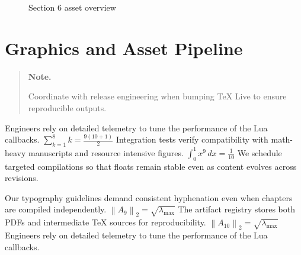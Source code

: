 \documentclass[12pt,a4paper,twocolumn]{article}
\newcommand{\paraid}[1]{\par\noindent\hypertarget{#1}{\ignorespaces}}
\begin{document}
\begin{figure}[htbp]
\centering
\hypertarget{fig-sec6}{}


\caption{Section 6 asset overview}
\label{fig:fig-sec6}
\hypertarget{fig-sec6-end}{}
\end{figure}


\section{Graphics and Asset Pipeline}
\label{sec7}

\begin{quote}
\hypertarget{sec7-note}{\textbf{Note.}} 
      Coordinate with release engineering when bumping TeX Live to ensure reproducible outputs.
    
\end{quote}

\paraid{sec7-p1}Engineers rely on detailed telemetry to tune the performance of the Lua callbacks. $\sum_{k=1}^{8} k = \frac{9(10+1)}{2}$ Integration tests verify compatibility with math-heavy manuscripts and resource intensive figures. $\int_{0}^{1} x^{9} \, dx = \frac{1}{10}$ We schedule targeted compilations so that floats remain stable even as content evolves across revisions.
\par

\paraid{sec7-p2}Our typography guidelines demand consistent hyphenation even when chapters are compiled independently. $\left\|A_{9}\right\|_{2} = \sqrt{\lambda_{\max}}$ The artifact registry stores both PDFs and intermediate TeX sources for reproducibility. $\left\|A_{10}\right\|_{2} = \sqrt{\lambda_{\max}}$ Engineers rely on detailed telemetry to tune the performance of the Lua callbacks.
\par
\end{document}

